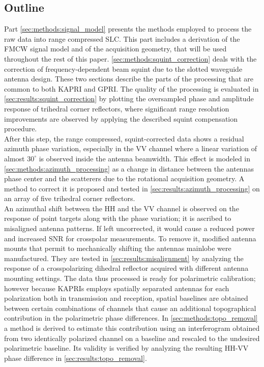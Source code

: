 \subsection{Outline}
Part \ref{sec:methods:signal_model} presents  the methods employed to process the raw data into range compressed SLC. This part includes a derivation of the FMCW signal model and of the acquisition geometry, that will be used throughout the rest of this paper. \autoref{sec:methods:squint_correction} deals with the correction of frequency-dependent beam squint due to the slotted waveguide antenna design. These two sections describe the parts of the processing that are common to both KAPRI and GPRI. The quality of the processing is evaluated in \autoref{sec:results:squint_correction} by plotting the oversampled phase and amplitude response of trihedral corner reflectors, where significant range resolution improvements are observed by applying the described squint compensation procedure.\\
After this step, the range compressed, squint-corrected data shows a residual azimuth phase variation, especially in the VV channel where a linear variation of almost $30^\circ$ is observed inside the antenna beamwidth. This effect is modeled in \autoref{sec:methods:azimuth_processing} as a change in distance between the antennas phase center and the scatterers due to the rotational acquisition geometry. A method to correct it is proposed and tested in \autoref{sec:results:azimuth_processing} on an array of five trihedral corner reflectors.\\ An azimuthal shift between the HH and the VV channel is observed on the  response of point targets along with the phase variation; it is ascribed to misaligned antenna patterns. If left uncorrected, it would cause a reduced power and increased SNR for crosspolar measurements. To remove it, modified antenna mounts that permit to mechanically shifting the antennas mainlobe were manufactured. They are tested in \autoref{sec:results:misalignment} by analyzing the response of a crosspolarizing dihedral reflector acquired with different antenna mounting settings.
The data thus processed is ready for polarimetric calibration; however because KAPRIs employs spatially separated antennas for each polarization both in transmission and reception, spatial baselines are obtained between certain combinations of channels that cause an additional topographical contribution in the polarimetric phase differences. In \autoref{sec:methods:topo_removal} a method is derived to estimate this contribution using an interferogram obtained from two identically polarized channel on a baseline and rescaled to the undesired polarimetric baseline. Its validity is verified by analyzing the resulting HH-VV phase difference in \autoref{sec:results:topo_removal}.\\
